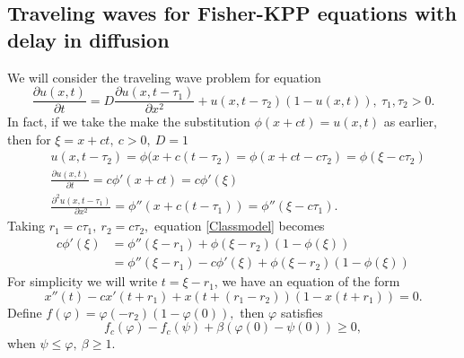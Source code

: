 \documentclass[12pt,letterpaper]{amsart}
\theoremstyle{definition}
\theoremstyle{remark}
\numberwithin{equation}{section}
\begin{document}
\subsection{Traveling waves for Fisher-KPP equations with delay in diffusion}
We will consider the traveling wave problem for equation
\begin{equation}\label{Classmodel}
\frac{\partial u(x,t)}{\partial t}= D\frac{\partial u(x,t-\tau_1)}{\partial x^2}+ u(x,t-\tau_2)\left(1-u(x,t)\right), \ \tau_1, \tau_2>0.   
\end{equation}
In fact, if we take the make the substitution $\phi(x+ct)=u(x,t)$ as earlier, then for $\xi=x+ct, \ c>0, \ D=1$
\begin{align*}
&u(x,t-\tau_2)=\phi(x+c(t-\tau_2)=  \phi(x+ct-c\tau_2)=\phi(\xi-c\tau_2)\\
&\frac{\partial u(x,t)}{\partial t}=c\phi'(x+ct)=c\phi'(\xi)\\
&\frac{\partial^2 u(x,t-\tau_1)}{\partial x^2}=\phi''(x+c(t-\tau_1))=\phi''(\xi-c\tau_1).
\end{align*}
Taking $r_1=c\tau_1, \ r_2=c\tau_2,$ equation \ref{Classmodel} becomes 
\begin{align*}
 c\phi'(\xi)&= \phi''(\xi-r_1)+ \phi(\xi-r_2)\left(1-\phi(\xi)\right)\\
 &= \phi''(\xi-r_1)-c\phi'(\xi)+ \phi(\xi-r_2)\left(1-\phi(\xi)\right)
\end{align*}
For simplicity we will write $t=\xi-r_1$, we have an equation of the form
\begin{equation} \label{cwm}
x''(t)-cx'(t+r_1)+x(t+(r_1-r_2))\left(1-x(t+r_1)\right)=0.      
\end{equation}
Define $f(\varphi)=\varphi(-r_2)\left(1-\varphi(0)\right),$ then $\varphi$ satisfies \[f_c(\varphi)-f_c(\psi ) +\beta (\varphi(0)-\psi (0)) \ge 0,\]
when $\psi\leq \varphi, \ \beta \geq 1.$ 
\end{document}
